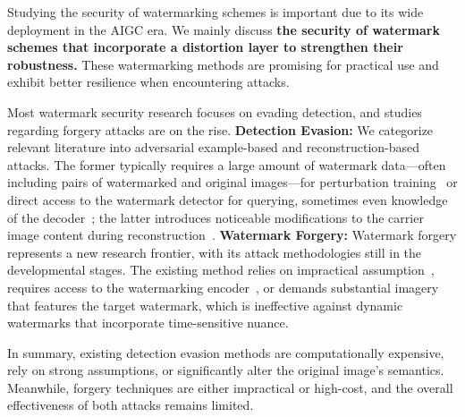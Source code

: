 Studying the security of watermarking schemes is important due to its wide deployment in the AIGC era. We mainly discuss \textbf{the security of watermark schemes that incorporate a distortion layer to strengthen their robustness.} These watermarking methods are promising for practical use and exhibit better resilience when encountering attacks. 

Most watermark security research focuses on evading detection, and studies regarding forgery attacks are on the rise. \textbf{Detection Evasion:} We categorize relevant literature into adversarial example-based and reconstruction-based attacks. The former typically requires a large amount of watermark data—often including pairs of watermarked and original images—for perturbation training~\cite{lukas2024leveraging,yang2024steganalysis, saberi2023robustness} or direct access to the watermark detector for querying, sometimes even knowledge of the decoder~\cite{lukas2024leveraging}; the latter introduces noticeable modifications to the carrier image content during reconstruction~\cite{saberi2023robustness, zhao2023invisible, Kassis2024Unmarker}. \textbf{Watermark Forgery:} Watermark forgery represents a new research frontier, with its attack methodologies still in the developmental stages. The existing method relies on impractical assumption~\cite{kutter2000watermark}, requires access to the watermarking encoder~\cite{saberi2023robustness}, or demands substantial imagery that features the target watermark, which is ineffective against dynamic watermarks that incorporate time-sensitive nuance. 



In summary, existing detection evasion methods are computationally expensive, rely on strong assumptions, or significantly alter the original image's semantics. Meanwhile, forgery techniques are either impractical or high-cost, and the overall effectiveness of both attacks remains limited.





